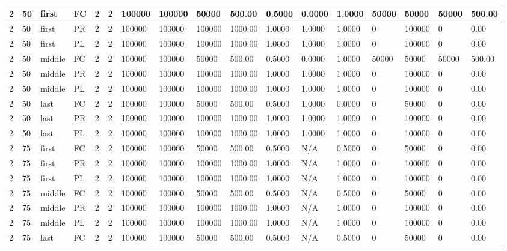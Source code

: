 \begin{tabular}{|l|l|l|l|l|l|l|l|l|l|l|l|l|l|l|l|l|}
2 & 50 & first & FC & 2 & 2 & 100000 & 100000 & 50000 & 500.00 & 0.5000 & 0.0000 & 1.0000 & 50000 & 50000 & 50000 & 500.00 \\ \hline
2 & 50 & first & PR & 2 & 2 & 100000 & 100000 & 100000 & 1000.00 & 1.0000 & 1.0000 & 1.0000 & 0 & 100000 & 0 & 0.00 \\ \hline
2 & 50 & first & PL & 2 & 2 & 100000 & 100000 & 100000 & 1000.00 & 1.0000 & 1.0000 & 1.0000 & 0 & 100000 & 0 & 0.00 \\ \hline
2 & 50 & middle & FC & 2 & 2 & 100000 & 100000 & 50000 & 500.00 & 0.5000 & 0.0000 & 1.0000 & 50000 & 50000 & 50000 & 500.00 \\ \hline
2 & 50 & middle & PR & 2 & 2 & 100000 & 100000 & 100000 & 1000.00 & 1.0000 & 1.0000 & 1.0000 & 0 & 100000 & 0 & 0.00 \\ \hline
2 & 50 & middle & PL & 2 & 2 & 100000 & 100000 & 100000 & 1000.00 & 1.0000 & 1.0000 & 1.0000 & 0 & 100000 & 0 & 0.00 \\ \hline
2 & 50 & last & FC & 2 & 2 & 100000 & 100000 & 50000 & 500.00 & 0.5000 & 1.0000 & 0.0000 & 0 & 50000 & 0 & 0.00 \\ \hline
2 & 50 & last & PR & 2 & 2 & 100000 & 100000 & 100000 & 1000.00 & 1.0000 & 1.0000 & 1.0000 & 0 & 100000 & 0 & 0.00 \\ \hline
2 & 50 & last & PL & 2 & 2 & 100000 & 100000 & 100000 & 1000.00 & 1.0000 & 1.0000 & 1.0000 & 0 & 100000 & 0 & 0.00 \\ \hline
2 & 75 & first & FC & 2 & 2 & 100000 & 100000 & 50000 & 500.00 & 0.5000 & N/A & 0.5000 & 0 & 50000 & 0 & 0.00 \\ \hline
2 & 75 & first & PR & 2 & 2 & 100000 & 100000 & 100000 & 1000.00 & 1.0000 & N/A & 1.0000 & 0 & 100000 & 0 & 0.00 \\ \hline
2 & 75 & first & PL & 2 & 2 & 100000 & 100000 & 100000 & 1000.00 & 1.0000 & N/A & 1.0000 & 0 & 100000 & 0 & 0.00 \\ \hline
2 & 75 & middle & FC & 2 & 2 & 100000 & 100000 & 50000 & 500.00 & 0.5000 & N/A & 0.5000 & 0 & 50000 & 0 & 0.00 \\ \hline
2 & 75 & middle & PR & 2 & 2 & 100000 & 100000 & 100000 & 1000.00 & 1.0000 & N/A & 1.0000 & 0 & 100000 & 0 & 0.00 \\ \hline
2 & 75 & middle & PL & 2 & 2 & 100000 & 100000 & 100000 & 1000.00 & 1.0000 & N/A & 1.0000 & 0 & 100000 & 0 & 0.00 \\ \hline
2 & 75 & last & FC & 2 & 2 & 100000 & 100000 & 50000 & 500.00 & 0.5000 & N/A & 0.5000 & 0 & 50000 & 0 & 0.00 \\ \hline

\end{tabular}
